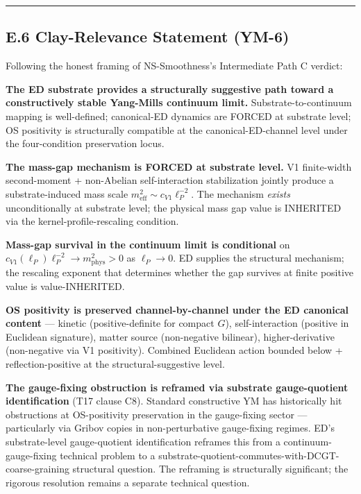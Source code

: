 \documentclass[
]{article}
\begin{document}
\begin{center}\rule{0.5\linewidth}{0.5pt}\end{center}

\subsection{E.6 Clay-Relevance Statement
(YM-6)}\label{e.6-clay-relevance-statement-ym-6}

Following the honest framing of NS-Smoothness's Intermediate Path C
verdict:

\textbf{The ED substrate provides a structurally suggestive path toward
a constructively stable Yang-Mills continuum limit.}
Substrate-to-continuum mapping is well-defined; canonical-ED dynamics
are FORCED at substrate level; OS positivity is structurally compatible
at the canonical-ED-channel level under the four-condition preservation
locus.

\textbf{The mass-gap mechanism is FORCED at substrate level.} V1
finite-width second-moment + non-Abelian self-interaction stabilization
jointly produce a substrate-induced mass scale
\(m_\mathrm{eff}^2 \sim c_{V1}\ell_P^{-2}\). The mechanism \emph{exists}
unconditionally at substrate level; the physical mass gap value is
INHERITED via the kernel-profile-rescaling condition.

\textbf{Mass-gap survival in the continuum limit is conditional} on
\(c_{V1}(\ell_P)\ell_P^{-2} \to m_\mathrm{phys}^2 > 0\) as
\(\ell_P \to 0\). ED supplies the structural mechanism; the rescaling
exponent that determines whether the gap survives at finite positive
value is value-INHERITED.

\textbf{OS positivity is preserved channel-by-channel under the ED
canonical content} --- kinetic (positive-definite for compact \(G\)),
self-interaction (positive in Euclidean signature), matter source
(non-negative bilinear), higher-derivative (non-negative via V1
positivity). Combined Euclidean action bounded below +
reflection-positive at the structural-suggestive level.

\textbf{The gauge-fixing obstruction is reframed via substrate
gauge-quotient identification} (T17 clause C8). Standard constructive YM
has historically hit obstructions at OS-positivity preservation in the
gauge-fixing sector --- particularly via Gribov copies in
non-perturbative gauge-fixing regimes. ED's substrate-level
gauge-quotient identification reframes this from a
continuum-gauge-fixing technical problem to a
substrate-quotient-commutes-with-DCGT-coarse-graining structural
question. The reframing is structurally significant; the rigorous
resolution remains a separate technical question.
\end{document}
